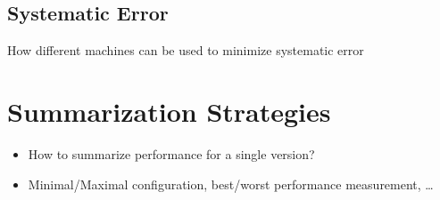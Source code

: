 \subsection{Systematic Error}
How different machines can be used to minimize systematic error

\section{Summarization Strategies}
\begin{itemize}
  \item How to summarize performance for a single version? 
  \item Minimal/Maximal configuration, best/worst performance measurement, \ldots
\end{itemize}


